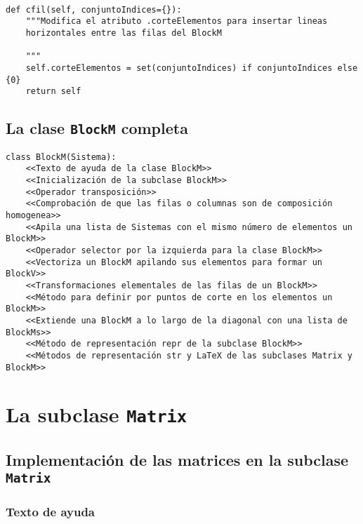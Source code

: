 \documentclass[11pt]{report}
\begin{document}
\begin{verbatim}

def cfil(self, conjuntoIndices={}):
    """Modifica el atributo .corteElementos para insertar lineas
    horizontales entre las filas del BlockM

    """
    self.corteElementos = set(conjuntoIndices) if conjuntoIndices else {0}
    return self

\end{verbatim}


\clearpage

\section{La clase \texttt{BlockM} completa}
\label{sec:orgf53398c}

\begin{verbatim}
class BlockM(Sistema):
    <<Texto de ayuda de la clase BlockM>>
    <<Inicialización de la subclase BlockM>>
    <<Operador transposición>>
    <<Comprobación de que las filas o columnas son de composición homogenea>>
    <<Apila una lista de Sistemas con el mismo número de elementos un BlockM>>
    <<Operador selector por la izquierda para la clase BlockM>>
    <<Vectoriza un BlockM apilando sus elementos para formar un BlockV>>
    <<Transformaciones elementales de las filas de un BlockM>>
    <<Método para definir por puntos de corte en los elementos un BlockM>>
    <<Extiende una BlockM a lo largo de la diagonal con una lista de BlockMs>>
    <<Método de representación repr de la subclase BlockM>>
    <<Métodos de representación str y LaTeX de las subclases Matrix y BlockM>>
\end{verbatim}


\chapter{La subclase \texttt{Matrix}}
\label{sec:org0d73885}

\section{Implementación de las matrices en la subclase \texttt{Matrix}}
\label{sec:org7e0acab}

\subsection{Texto de ayuda}
\label{sec:orga39e4a0}
\end{document}
